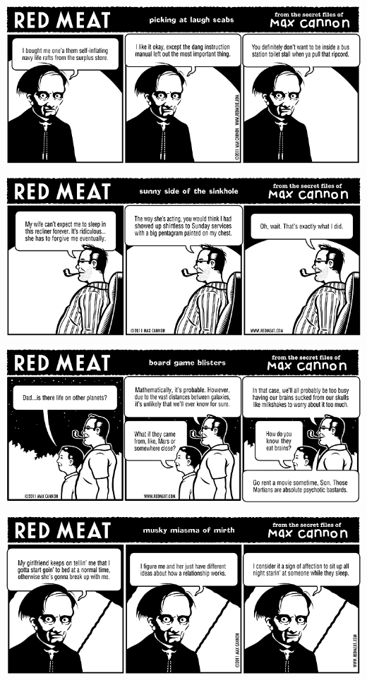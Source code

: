 \documentclass[a4paper,twoside,11pt]{article}
\begin{document}
\includegraphics[width=\textwidth]{redmeat_2011-07-26.png}



\includegraphics[width=\textwidth]{redmeat_2011-08-02.png}



\includegraphics[width=\textwidth]{redmeat_2011-08-09.png}



\includegraphics[width=\textwidth]{redmeat_2011-08-16.png}
\end{document}
